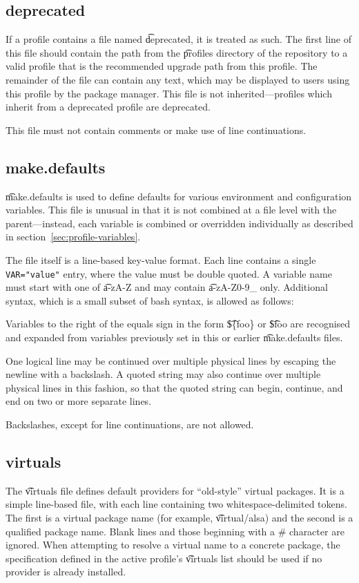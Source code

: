 \subsection{deprecated}
If a profile contains a file named \t{deprecated}, it is treated as such. The first line of this
file should contain the path from the \t{profiles} directory of the repository to a valid profile
that is the recommended upgrade path from this profile. The remainder of the file can contain any
text, which may be displayed to users using this profile by the package manager. This file is not
inherited---profiles which inherit from a deprecated profile are  deprecated.

This file must not contain comments or make use of line continuations.

\subsection{make.defaults}
\t{make.defaults} is used to define defaults for various environment and configuration variables.
This file is unusual in that it is not combined at a file level with the parent---instead, each
variable is combined or overridden individually as described in section~\ref{sec:profile-variables}.

The file itself is a line-based key-value format. Each line contains a single \verb|VAR="value"|
entry, where the value must be double quoted. A variable name must start with one of \t{a-zA-Z}
and may contain \t{a-zA-Z0-9\_} only. Additional syntax, which is a small subset of
bash syntax, is allowed as follows:

\begin{compactitem}
\item Variables to the right of the equals sign in the form \t{\$\{foo\}} or \t{\$foo} are recognised and
  expanded from variables previously set in this or earlier \t{make.defaults} files.
\item One logical line may be continued over multiple physical lines by escaping the newline with a
  backslash. A quoted string may also continue over multiple physical lines in this fashion, so that 
  the quoted string can begin, continue, and end on two or more separate lines.
\item Backslashes, except for line continuations, are not allowed.
\end{compactitem}

\subsection{virtuals}
\label{sec:profiles-virtuals}
The \t{virtuals} file defines default providers for ``old-style'' virtual packages. It is a simple
line-based file, with each line containing two whitespace-delimited tokens. The first is a virtual
package name (for example, \t{virtual/alsa}) and the second is a qualified package name. Blank lines
and those beginning with a \# character are ignored. When attempting to resolve a virtual name to a
concrete package, the specification defined in the active profile's \t{virtuals} list should be used if no
provider is already installed.

